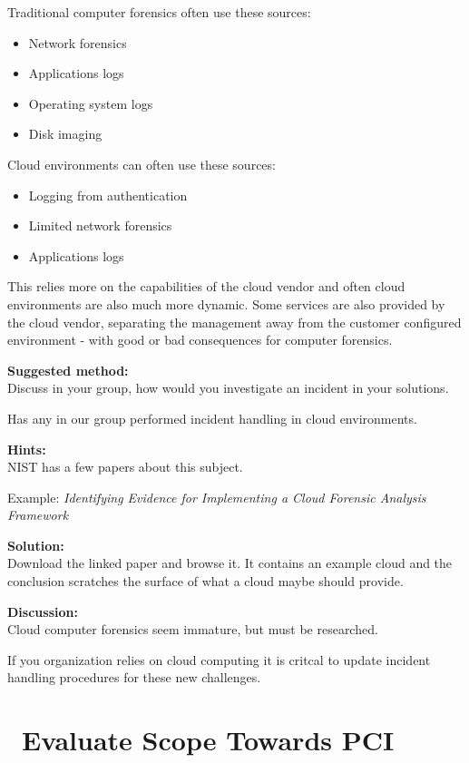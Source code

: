 \documentclass[a4paper,11pt,notitlepage]{report}
\begin{document}
Traditional computer forensics often use these sources:
\begin{itemize}
\item Network forensics
\item Applications logs
\item Operating system logs
\item Disk imaging
\end{itemize}

Cloud environments can often use these sources:

\begin{itemize}
\item Logging from authentication
\item Limited network forensics
\item Applications logs
\end{itemize}

This relies more on the capabilities of the cloud vendor and often cloud environments are also much more dynamic. Some services are also provided by the cloud vendor, separating the management away from the customer configured environment - with good or bad consequences for computer forensics.

{\bf Suggested method:}\\
Discuss in your group, how would you investigate an incident in your solutions.

Has any in our group performed incident handling in cloud environments.

{\bf Hints:}\\
NIST has a few papers about this subject.

Example:
\emph{Identifying Evidence for Implementing a Cloud Forensic Analysis Framework}

{\bf Solution:}\\
Download the linked paper and browse it. It contains an example cloud and the conclusion scratches the surface of what a cloud maybe should provide.

{\bf Discussion:}\\
Cloud computer forensics seem immature, but must be researched.

If you organization relies on cloud computing it is critcal to update incident handling procedures for these new challenges.


\chapter{\faInfoCircle\ Evaluate Scope Towards PCI}
\label{ex:compliance-evaluation}
\end{document}
